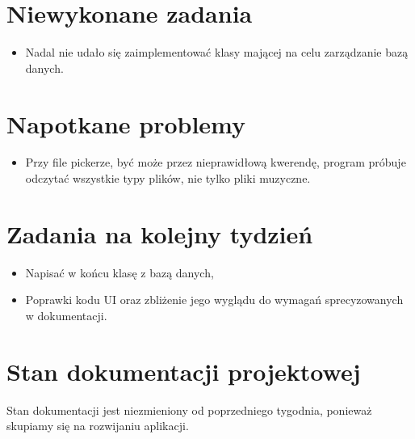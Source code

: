 \documentclass[12pt,a4paper]{mwart}
\begin{document}
\section{Niewykonane zadania}

\begin{itemize}
	\item Nadal nie udało się zaimplementować klasy mającej na celu zarządzanie bazą danych.
\end{itemize}

\section{Napotkane problemy}

\begin{itemize}
	\item Przy file pickerze, być może przez nieprawidłową kwerendę, program próbuje odczytać wszystkie typy plików, nie tylko pliki muzyczne.
\end{itemize}

\section{Zadania na kolejny tydzień}

\begin{itemize}
	\item Napisać w końcu klasę z bazą danych,

	\item Poprawki kodu UI oraz zbliżenie jego wyglądu do wymagań sprecyzowanych w dokumentacji.
\end{itemize}

\section{Stan dokumentacji projektowej}

Stan dokumentacji jest niezmieniony od poprzedniego tygodnia, ponieważ skupiamy się na rozwijaniu aplikacji.
\end{document}
